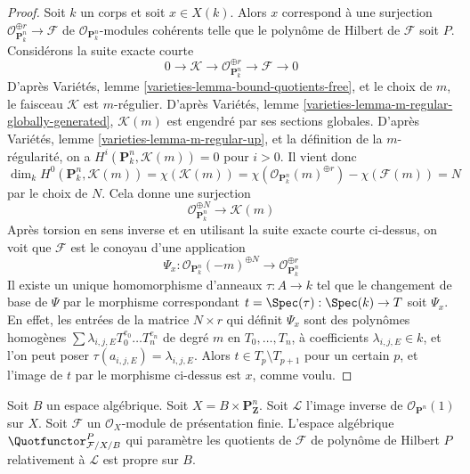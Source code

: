 \begin{proof}
\medskip\noindent
Soit $k$ un corps et soit $x \in X(k)$. Alors $x$ correspond à une
surjection $\mathcal{O}_{\mathbf{P}^n_k}^{\oplus r} \to \mathcal{F}$ de
$\mathcal{O}_{\mathbf{P}^n_k}$-modules cohérents telle que le polynôme de
Hilbert de $\mathcal{F}$ soit $P$. Considérons la suite exacte courte
$$
0 \to \mathcal{K} \to
\mathcal{O}_{\mathbf{P}^n_k}^{\oplus r} \to
\mathcal{F} \to 0
$$
D'après Variétés, lemme \ref{varieties-lemma-bound-quotients-free}, et le
choix de $m$, le faisceau $\mathcal{K}$ est $m$-régulier.
D'après Variétés, lemme
\ref{varieties-lemma-m-regular-globally-generated},
$\mathcal{K}(m)$ est engendré par ses sections globales.
D'après Variétés, lemme \ref{varieties-lemma-m-regular-up}, et la
définition de la $m$-régularité, on a
$H^i(\mathbf{P}^n_k, \mathcal{K}(m)) = 0$ pour $i > 0$.
Il vient donc
$$
\dim_k H^0(\mathbf{P}^n_k, \mathcal{K}(m)) =
\chi(\mathcal{K}(m)) =
\chi(\mathcal{O}_{\mathbf{P}^n_k}(m)^{\oplus r}) -
\chi(\mathcal{F}(m)) = N
$$
par le choix de $N$. Cela donne une surjection
$$
\mathcal{O}_{\mathbf{P}^n_k}^{\oplus N}
\longrightarrow
\mathcal{K}(m)
$$
Après torsion en sens inverse et en utilisant la suite exacte courte
ci-dessus, on voit que $\mathcal{F}$ est le conoyau d'une application
$$
\Psi_x :
\mathcal{O}_{\mathbf{P}^n_k}(-m)^{\oplus N}
\to
\mathcal{O}_{\mathbf{P}^n_k}^{\oplus r}
$$
Il existe un unique homomorphisme d'anneaux $\tau : A \to k$ tel que le
changement de base de $\Psi$ par le morphisme correspondant
$t = \Spec(\tau) : \Spec(k) \to T$ soit $\Psi_x$.
En effet, les entrées de la matrice $N \times r$ qui définit $\Psi_x$
sont des polynômes homogènes
$\sum \lambda_{i, j, E} T_0^{e_0} \ldots T_n^{e_n}$
de degré $m$ en $T_0, \ldots, T_n$, à coefficients
$\lambda_{i, j, E} \in k$, et l'on peut poser
$\tau(a_{i, j, E}) = \lambda_{i, j, E}$.
Alors $t \in T_p \setminus T_{p + 1}$ pour un certain $p$, et l'image de
$t$ par le morphisme ci-dessus est $x$, comme voulu.
\end{proof}

\begin{lemma}
\label{lemma-quot-Pn-over-base}
Soit $B$ un espace algébrique. Soit
$X = B \times \mathbf{P}^n_\mathbf{Z}$. Soit $\mathcal{L}$ l'image
inverse de $\mathcal{O}_{\mathbf{P}^n}(1)$ sur $X$.
Soit $\mathcal{F}$ un $\mathcal{O}_X$-module de présentation finie.
L'espace algébrique $\Quotfunctor^P_{\mathcal{F}/X/B}$ qui paramètre les
quotients de $\mathcal{F}$ de polynôme de Hilbert $P$ relativement à
$\mathcal{L}$ est propre sur $B$.
\end{lemma}

